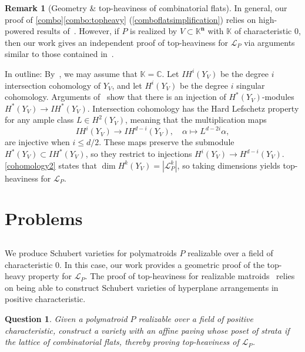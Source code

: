 \documentclass[11pt]{article}
\newtheorem{ques}[theo]{Question}
\theoremstyle{definition}
\newtheorem{rema}[theo]{Remark}
\numberwithin{equation}{section}
\newcommand{\C}{\mathbb{C}}
\newcommand{\K}{\mathbb{K}}
\newcommand{\IH}{I\!H}
\newcommand{\revision}[1]{{#1}}
\begin{document}
\begin{rema}[Geometry \& top-heaviness of combinatorial flats]
  In general, our proof of \cref{combo}\cref{combo:topheavy} (\cref{comboflatsimplification}) relies on high-powered results of~\cite{BHMPW20b}.
  However, if $P$ is realized by $V \subset \K^{\mathbf n}$ with $\K$ of characteristic 0, then our work gives an independent proof of top-heaviness for $\mathcal L_P$ via arguments similar to those contained in~\cite{HW17,BE09}.

  In outline:
  By~\cite[Proposition 6.8.11]{O11}, we may assume that $\K = \C$.
  Let $\IH^i(Y_V)$ be the degree $i$ intersection cohomology of $Y_V$, and let $H^i(Y_V)$ be the degree $i$ singular cohomology.
  Arguments of~\cite{HW17,BE09} show that there is an injection of $H^*(Y_V)$-modules $H^*(Y_V) \to \IH^*(Y_V)$.
  Intersection cohomology has the Hard Lefschetz property for any ample class $L \in H^{2}(Y_V)$, meaning that the multiplication maps
  \[
\IH^i(Y_V) \to \IH^{d-i}(Y_V), \quad \alpha \mapsto L^{d-2i} \alpha,
  \]
  are injective when $i \leq d/2$.
  These maps preserve the submodule $H^*(Y_V) \subset \IH^*(Y_V)$, so they restrict to injections $H^i(Y_V) \to H^{d-i}(Y_V)$.
  \cref{cohomology2} states that $\dim H^k(Y_V) = |\mathcal L_P^k|$, so taking dimensions yields top-heaviness for $\mathcal L_P$.
\end{rema}

\section{Problems}\label{sec:problems}
\subsection{} We produce Schubert varieties for polymatroids $P$ realizable over a field of characteristic 0.
In this case, our work provides a geometric proof of the top-heavy property for $\mathcal L_P$.
The proof of top-heaviness for realizable matroids~\cite{HW17} relies on being able to construct Schubert varieties of hyperplane arrangements in positive characteristic.
\begin{ques}
  \revision{Given a polymatroid $P$ realizable over a field of positive characteristic, construct a variety with an affine paving whose poset of strata if the lattice of combinatorial flats, thereby proving top-heaviness of $\mathcal L_P$.}
  \end{ques}
\end{document}
